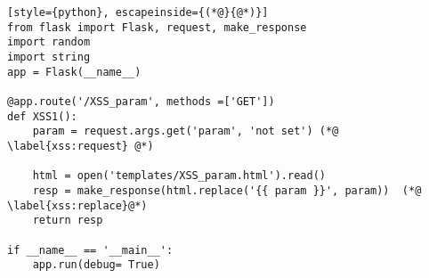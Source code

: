\begin{lstlisting}[style={python}, escapeinside={(*@}{@*)}]
from flask import Flask, request, make_response
import random
import string
app = Flask(__name__)

@app.route('/XSS_param', methods =['GET'])
def XSS1():
    param = request.args.get('param', 'not set') (*@ \label{xss:request} @*)

    html = open('templates/XSS_param.html').read()
    resp = make_response(html.replace('{{ param }}', param))  (*@ \label{xss:replace}@*)
    return resp

if __name__ == '__main__':
    app.run(debug= True)
\end{lstlisting}
